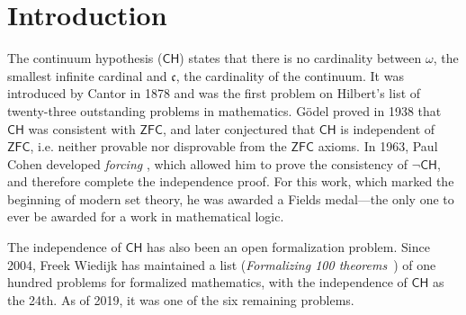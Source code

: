 \documentclass[sigplan,10pt,review, anonymous]{acmart}
\newcommand{\ZFC}{\mathsf{ZFC}}
\newcommand{\CH}{\mathsf{CH}}
\theoremstyle{definition}
\begin{document}



\maketitle


\section{Introduction}
\label{sect:intro}
The continuum hypothesis ($\mathsf{CH}$) states that there is no cardinality between $\omega$, the smallest infinite cardinal and $\mathfrak{c}$, the cardinality of the continuum.
It was introduced by Cantor \cite{cantor1878beitrag} in 1878 and was the first problem on Hilbert's list of twenty-three outstanding problems in mathematics.
G\"odel \cite{godel1938consistency} proved in 1938 that $\mathsf{CH}$ was consistent with $\ZFC$, and later conjectured that $\mathsf{CH}$ is independent of $\ZFC$, i.e. neither provable nor disprovable from the $\ZFC$ axioms.
In 1963, Paul Cohen developed \emph{forcing} \cite{cohen-the-independence-of-the-continuum-hypothesis-1,cohen1964independence2}, which allowed him to prove the consistency of $\neg \mathsf{CH}$, and therefore complete the independence proof.
For this work, which marked the beginning of modern set theory, he was awarded a Fields medal---the only one to ever be awarded for a work in mathematical logic.

The independence of \(\CH\) has also been an open formalization problem. Since 2004, Freek Wiedijk has maintained a list (\emph{Formalizing 100 theorems}~\cite{wiedijk100theorems}) of one hundred problems for formalized mathematics, with the independence of \(\CH\) as the 24th. As of 2019, it was one of the six remaining problems.
\end{document}
